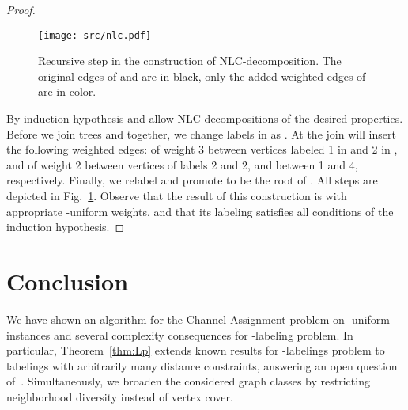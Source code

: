 \documentclass[a4paper,UKenglish]{lipics}
\theoremstyle{plain}
\theoremstyle{definition}
\begin{document}
{\begin{proof}
\begin{figure}[ht!]
  \texttt{[image: src/nlc.pdf]}
  \caption{Recursive step in the construction of NLC-decomposition. The original edges of  and  are in black, 
	         only the added weighted edges of  are in color.}
	\label{fig:nlc}
\end{figure}

By induction hypothesis  and  allow NLC-decompositions of the desired properties.
Before we join trees  and  together, we change labels in  as .
At the join will insert the following weighted edges: of weight 3 between vertices labeled 1 in  and 2 in , 
and of weight 2 between vertices of labels 2 and 2, and between 1 and 4, respectively.
Finally, we relabel  and promote  to be the root  of . 
All steps are depicted in Fig.~\ref{fig:nlc}.  Observe that the result of this construction is 
with appropriate -uniform weights, and that its labeling satisfies all conditions of the induction hypothesis.
\end{proof}





 

 \section{Conclusion}\label{s:con}

We have shown an algorithm for the {\sc Channel Assignment} problem on -uniform instances 
and several complexity consequences for
{\sc -labeling} problem. In particular, Theorem~\ref{thm:Lp} extends known results
for -labelings problem to labelings with arbitrarily many distance constraints, answering
an open question of~\cite{l:FGK09}. Simultaneously, we broaden the considered graph classes by restricting
neighborhood diversity instead of vertex cover.

\begin{figure}[!ht]
  \begin{minipage}[c]{0.3\textwidth}
\end{minipage}
\end{figure}}
\end{document}
